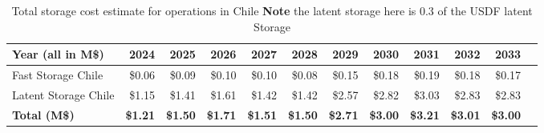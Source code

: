 \tiny \begin{longtable} { |p{}  |r  |r  |r  |r  |r  |r  |r  |r  |r  |r  |r |} 
\caption{Total storage cost estimate for operations in Chile  {\bf Note} the latent storage here is 0.3 of the USDF latent Storage \label{tab:opsStorageChile}}\\ 
\hline 
\textbf{Year (all in M\$)}&\textbf{2024}&\textbf{2025}&\textbf{2026}&\textbf{2027}&\textbf{2028}&\textbf{2029}&\textbf{2030}&\textbf{2031}&\textbf{2032}&\textbf{2033} \\ \hline
{Fast Storage Chile}&{\$0.06}&{\$0.09}&{\$0.10}&{\$0.10}&{\$0.08}&{\$0.15}&{\$0.18}&{\$0.19}&{\$0.18}&{\$0.17} \\ \hline
{Latent Storage Chile}&{\$1.15}&{\$1.41}&{\$1.61}&{\$1.42}&{\$1.42}&{\$2.57}&{\$2.82}&{\$3.03}&{\$2.83}&{\$2.83} \\ \hline
\textbf{Total (M\$)}&\textbf{\$1.21}&\textbf{\$1.50}&\textbf{\$1.71}&\textbf{\$1.51}&\textbf{\$1.50}&\textbf{\$2.71}&\textbf{\$3.00}&\textbf{\$3.21}&\textbf{\$3.01}&\textbf{\$3.00} \\ \hline
\end{longtable} \normalsize

